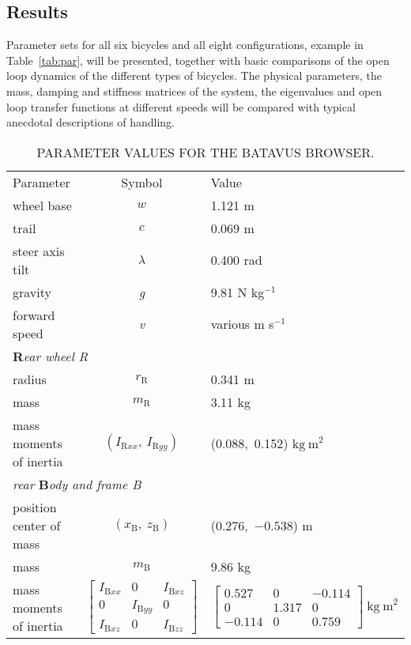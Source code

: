 \documentclass{bmd2010a}
\begin{document}
\subsection*{Results}
Parameter sets for all six bicycles and all eight
configurations, example in Table~\ref{tab:par},  will be
presented, together with basic comparisons of the open loop dynamics of the
different types of bicycles. The physical parameters, the mass, damping and stiffness
matrices of the system, the eigenvalues and open loop transfer functions at
different speeds will be compared with typical anecdotal
descriptions of handling.
\begin{table*}[tb]
\centering
\caption{PARAMETER VALUES FOR THE BATAVUS BROWSER.}
{\small
\begin{tabular}{lcl}
&&\\
\hline
Parameter & Symbol & Value \\
\hline
wheel base & $w$ & 1.121 m \\
trail & $c$ & 0.069 m \\
steer axis tilt & \emph{$\lambda$} & 0.400 rad \\
gravity & \emph{g} & 9.81 N kg$^{-1}$ \\
forward speed & \emph{v} & various m s$^{-1}$ \\

\multicolumn{3}{l}{\textbf{R}\emph{ear wheel R}}\\
radius & \emph{$r_\mathrm{R}$} & 0.341 m\\
mass & \emph{$m_\mathrm{R}$} &  3.11 kg \\
mass moments of inertia & \emph{$(I_{\mathrm{R}xx},\
I_{\mathrm{R}yy})$} &
(0.088,\ 0.152) $\mathrm{kg\ m}^2$ \\

\multicolumn{3}{l}{\emph{rear} \textbf{B}\emph{ody and frame B}}\\
position center of mass & \emph{$(x_\mathrm{B},\ z_\mathrm{B})$} &
($0.276$,\ $-0.538$) m\\
mass & \emph{$m_\mathrm{B}$} & 9.86 kg \\
mass moments of inertia & $\left[ \begin{array}{ccc}
I_{\mathrm{B}xx} &  0 & I_{\mathrm{B}xz}\\
0 & I_{\mathrm{B}yy} & 0 \\
I_{\mathrm{B}xz} & 0 & I_{\mathrm{B}zz}
\end{array} \right] $ &
$\left[ \begin{array}{ccc}
0.527 &  0 & -0.114\\
0 & 1.317 & 0 \\
-0.114 & 0 & 0.759
\end{array} \right] \ \mathrm{kg\ m}^{2}$\\


\end{tabular}}
\end{table*}
\end{document}
